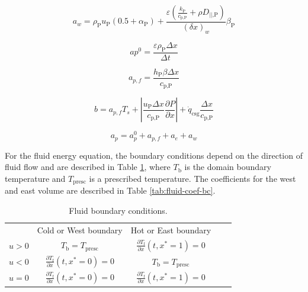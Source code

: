 \documentclass[review,preprint,12pt]{elsarticle}
\begin{document}
$$
a_w = \rho_\textrm{P} u_\textrm{P} (0.5+\alpha_\textrm{P}) +\frac{\varepsilon (\frac{k_\textrm{P}}{c_\textrm{p,P}}+\rho D_\textrm{||,P})}{(\delta x)_w}\beta_\textrm{P}
$$

$$
ap^0 = \frac{\varepsilon\rho_\textrm{P}\Delta x}{\Delta t}
$$

$$
a_{p,f} = \frac{h_\textrm{P}\beta\Delta x}{c_\textrm{p,P}} 
$$

$$
b = a_{p,f}T_s + \left| \frac{u_\textrm{P}\Delta x}{c_\textrm{p,P}}\frac{\partial P}{\partial x}\right| + \dot{q}_\textrm{csg}\frac{\Delta x}{c_\textrm{p,P}}
$$

$$
a_p = a_p^0 + a_{p,f} + a_e + a_w 
$$

For the fluid energy equation, the boundary conditions depend on the direction of fluid flow and are described in Table \ref{tab:fluid-bc}, where $T_\textrm{b}$ is the domain boundary temperature and $T_\textrm{presc}$ is a prescribed temperature. The coefficients for the west and east volume are described in Table \ref{tab:fluid-coef-bc}.

\begin{table}[htp]
\centering
\caption{Fluid boundary conditions.}
\label{tab:fluid-bc}
\begin{tabular}{c|c|c|ll}
\cline{2-3}
\multicolumn{1}{l|}{}       & Cold or West boundary                                  & Hot or East boundary                                  &  &  \\ \cline{1-3}
\multicolumn{1}{|c|}{$u>0$} & $T_\textrm{b} = T_\textrm{presc}$                      & $\frac{\partial T_\textrm{f}}{\partial x}(t,x^*=1)=0$ &  &  \\ \cline{1-3}
\multicolumn{1}{|c|}{$u<0$} & $\frac{\partial T_\textrm{f}}{\partial x}(t,x^*=0) =0$ & $T_\textrm{b} = T_\textrm{presc}$                     &  &  \\ \cline{1-3}
\multicolumn{1}{|c|}{$u=0$} & $\frac{\partial T_\textrm{f}}{\partial x}(t,x^*=0)=0$  & $\frac{\partial T_\textrm{f}}{\partial x}(t,x^*=1)=0$ &  &  \\ \cline{1-3}
\end{tabular}
\end{table}
\end{document}
